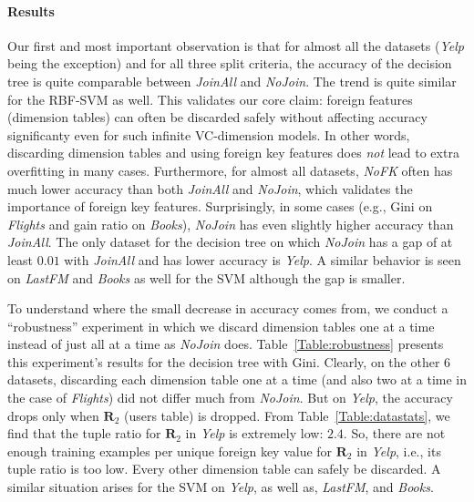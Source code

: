\documentclass[sigconf]{acmart}
\begin{document}
\vspace{-1mm}
\paragraph*{\textbf{Results}}
Our first and most important observation is that for almost all the datasets (\textit{Yelp} being the exception) and for all three split criteria, the accuracy of the decision tree 
is quite comparable between \textit{JoinAll} and \textit{NoJoin}. The trend is quite similar for the RBF-SVM as well.
This validates our core claim: foreign features (dimension tables) can often be discarded safely without affecting accuracy significanty even for such infinite VC-dimension models.
In other words, discarding dimension tables and using foreign key features does \textit{not} lead to extra overfitting in many cases.
Furthermore, for almost all datasets, \textit{NoFK} often has much lower accuracy than both \textit{JoinAll} and \textit{NoJoin}, which validates the importance of foreign key features.
Surprisingly, in some cases (e.g., Gini on \textit{Flights} and gain ratio on \textit{Books}), \textit{NoJoin} has even slightly higher accuracy than \textit{JoinAll}.
The only dataset for the decision tree on which \textit{NoJoin} has a gap of at least $0.01$ with \textit{JoinAll} and has lower accuracy is \textit{Yelp}. 
A similar behavior is seen on \textit{LastFM} and \textit{Books} as well for the SVM although the gap is smaller.

To understand where the small decrease in accuracy comes from, we conduct a ``robustness'' experiment in which we discard dimension tables one at a time instead of just all at a time 
as \textit{NoJoin} does. Table~\ref{Table:robustness} presents this experiment's results for the decision tree with Gini.
Clearly, on the other $6$ datasets, discarding each dimension table one at a time (and also two at a time in the case of \textit{Flights}) did not differ much from \textit{NoJoin}.
But on \textit{Yelp}, the accuracy drops only when $\textbf{R}_2$ (users table) is dropped. From Table~\ref{Table:datastats}, we find that the tuple ratio for $\textbf{R}_2$ in 
\textit{Yelp} is extremely low: $2.4$. So, there are not enough training examples per unique foreign key value for $\textbf{R}_2$ in \textit{Yelp}, i.e., its tuple ratio is too low. 
Every other dimension table can safely be discarded. A similar situation arises for the SVM on \textit{Yelp}, as well as, \textit{LastFM}, and \textit{Books}.
\end{document}

